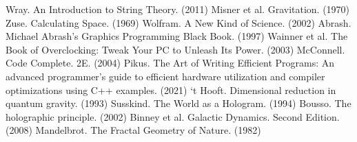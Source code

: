 \documentclass[12pt]{article}
\begin{document}
\begin{thebibliography}{9}

 Wray. An Introduction to String Theory. (2011)
 Misner et al. Gravitation. (1970)
 Zuse. Calculating Space. (1969)
 Wolfram. A New Kind of Science. (2002)
 Abrash. Michael Abrash's Graphics Programming Black Book. (1997)
 Wainner et al. The Book of Overclocking: Tweak Your PC to Unleash Its Power. (2003)
 McConnell. Code Complete. 2E. (2004)
 Pikus. The Art of Writing Efficient Programs: An advanced programmer's guide to efficient hardware utilization and compiler optimizations using C++ examples. (2021)
 `t Hooft. Dimensional reduction in quantum gravity. (1993)
 Susskind. The World as a Hologram. (1994)
 Bousso. The holographic principle. (2002)
 Binney et al. Galactic Dynamics. Second Edition. (2008)
 Mandelbrot. The Fractal Geometry of Nature. (1982)








\end{thebibliography}
\end{document}
